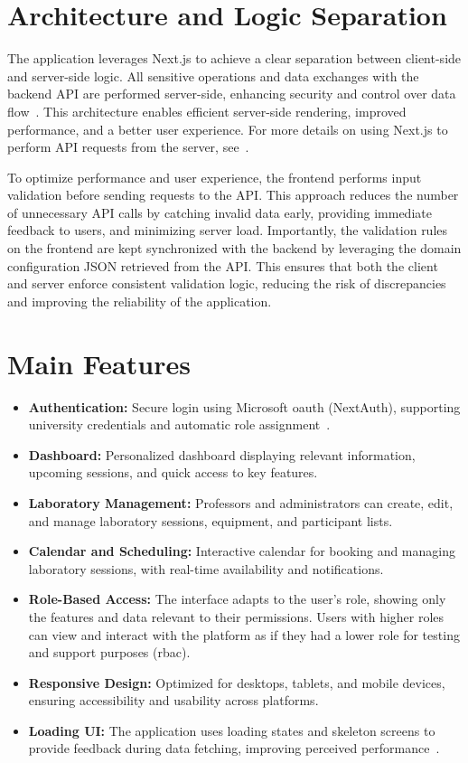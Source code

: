 \section{Architecture and Logic Separation}

The application leverages Next.js to achieve a clear separation between client-side and server-side logic. All sensitive operations and data exchanges with the backend API are performed server-side, enhancing security and control over data flow~\cite{nextjs-server-client-components,nextjs-data-fetching}. This architecture enables efficient server-side rendering, improved performance, and a better user experience. For more details on using Next.js to perform API requests from the server, see~\cite{auth0-nextjs-server-actions}.

To optimize performance and user experience, the frontend performs input validation before sending requests to the API. This approach reduces the number of unnecessary API calls by catching invalid data early, providing immediate feedback to users, and minimizing server load. Importantly, the validation rules on the frontend are kept synchronized with the backend by leveraging the domain configuration JSON retrieved from the API. This ensures that both the client and server enforce consistent validation logic, reducing the risk of discrepancies and improving the reliability of the application.

\section{Main Features}
\begin{itemize}
    \item \textbf{Authentication:} Secure login using Microsoft \ac{oauth} (NextAuth), supporting university credentials and automatic role assignment~\cite{nextjs-authentication}.
    \item \textbf{Dashboard:} Personalized dashboard displaying relevant information, upcoming sessions, and quick access to key features.
    \item \textbf{Laboratory Management:} Professors and administrators can create, edit, and manage laboratory sessions, equipment, and participant lists.
    \item \textbf{Calendar and Scheduling:} Interactive calendar for booking and managing laboratory sessions, with real-time availability and notifications.
    \item \textbf{Role-Based Access:} The interface adapts to the user's role, showing only the features and data relevant to their permissions. Users with higher roles can view and interact with the platform as if they had a lower role for testing and support purposes (\ac{rbac}).
    \item \textbf{Responsive Design:} Optimized for desktops, tablets, and mobile devices, ensuring accessibility and usability across platforms.
    \item \textbf{Loading UI:} The application uses loading states and skeleton screens to provide feedback during data fetching, improving perceived performance~\cite{nextjs-loading-ui}.
\end{itemize}

